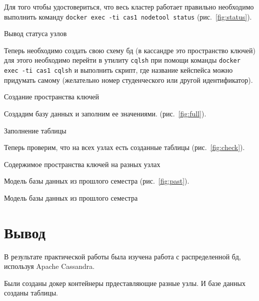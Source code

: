 Для того чтобы удостовериться, что весь кластер работает правильно
необходимо выполнить команду \texttt{docker exec -ti cas1 nodetool status}
(рис.~\ref{fig:status}).

\begin{image}
	\caption{Вывод статуса узлов}
	\label{fig:status}
\end{image}

Теперь необходимо создать свою схему бд (в кассандре это
пространство ключей) для этого необходимо перейти в утилиту \texttt{cqlsh}
при помощи команды \texttt{docker exec -ti cas1 cqlsh} и выполнить скрипт,
где название кейспейса можно придумать самому (желательно номер
студенческого или другой идентификатор).

\begin{image}
	\caption{Создание пространства ключей}
	\label{fig:keyspace}
\end{image}

Создадим базу данных и заполним ее значениями.
(рис.~\ref{fig:full}).

\begin{image}
	\caption{Заполнение таблицы}
	\label{fig:full}
\end{image}

Теперь проверим, что на всех узлах есть созданные таблицы
(рис.~\ref{fig:check}).

\begin{image}
	\caption{Содержимое пространства ключей на разных узлах}
	\label{fig:check}
\end{image}

\clearpage

Модель базы данных из прошлого семестра (рис.~\ref{fig:past}).

\begin{image}
	\caption{Модель базы данных из прошлого семестра}
	\label{fig:past}
\end{image}

\section*{\LARGE Вывод}
В результате практической работы была изучена работа
с распределенной бд, используя Apache Cassandra.\par
Были созданы докер контейнеры прдеставляющие разные узлы.
И базе данных созданы таблицы.